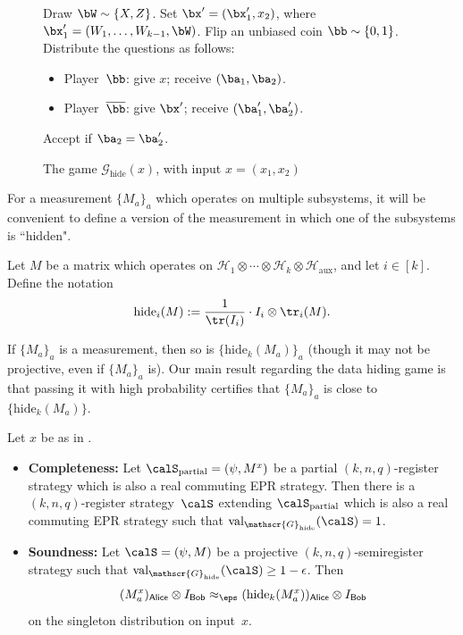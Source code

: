 \documentclass[11pt]{article}
\newcommand{\game}{\mathscr{G}}
\newcommand{\valstrat}[2]{\mathrm{val}_{#1}(#2)}
\newcommand{\reg}[1]{{\mathsf{#1}}}
\newcommand{\hide}[2]{\mathrm{hide}_{#1}(#2)}
\begin{document}
{
\begin{figure}[htbp]
Draw $\bW \sim \{X, Z\}$. Set $\bx' = (\bx_1', x_2)$, where $\bx_1' = (W_1, \ldots, W_{k-1}, \bW)$.
Flip an unbiased coin $\bb \sim \{0, 1\}$. Distribute the questions as follows:
\begin{itemize}
\item[$\circ$] Player~$\bb$: give $x$; receive $(\ba_1, \ba_2)$.
\item[$\circ$] Player~$\overline{\bb}$: give $\bx'$; receive $(\ba_1', \ba_2')$.
\end{itemize}
Accept if $\ba_2 = \ba_2'$.
\caption{The game $\game_{\mathrm{hide}}(x)$, with input $x = (x_1, x_2)$ \label{fig:hide-one}}
\end{figure}
}

For a measurement $\{M_a\}_a$ which operates on multiple subsystems,
it will be convenient to define a version of the measurement in which one of the subsystems is ``hidden".

\begin{notation}
Let $M$ be a matrix which operates on $\mathcal{H}_1 \otimes \cdots \otimes \mathcal{H}_k \otimes \mathcal{H}_{\mathrm{aux}}$, and let $i \in [k]$.
Define the notation
\begin{equation*}
\mathrm{hide}_i(M)
:= \frac{1}{\tr(I_i)} \cdot I_i \otimes \tr_i(M).
\end{equation*}
\label{not:hide}
\end{notation}
If $\{M_a\}_a$ is a measurement, then so is $\{\hide{k}{M_a}\}_a$ (though it may not be projective, even if $\{M_a\}_a$ is).
Our main result regarding the data hiding game is that passing it with high probability certifies that $\{M_a\}_a$ is close to $\{\hide{k}{M_a}\}$.

\begin{theorem}\label{thm:data-hiding-game}
Let $x$ be as in .
\begin{itemize}
\item[$\circ$] \textbf{Completeness:}
Let $\calS_{\mathrm{partial}} = (\psi, M^x)$ be a partial $(k,n,q)$-register strategy
			which is also a real commuting EPR strategy.
			Then there is a $(k,n,q)$-register
                        strategy~$\calS$ extending
                        $\calS_{\mathrm{partial}}$ which is also a
                        real commuting EPR strategy
			such that $\valstrat{\game_{\mathrm{hide}}}{\calS} = 1$.
\item[$\circ$] \textbf{Soundness:} 
Let $\calS = (\psi, M)$ be a projective $(k, n, q)$-semiregister strategy such that $\valstrat{\game_{\mathrm{hide}}}{\calS} \geq 1-\epsilon$. Then
\begin{equation*}
(M_a^x)_{\reg{Alice}} \otimes I_{\reg{Bob}} \approx_\eps (\hide{k}{M_a^x})_{\reg{Alice}} \otimes I_{\reg{Bob}}
\end{equation*}
on the singleton distribution on input~$x$.
\end{itemize}
\end{theorem}
\end{document}
